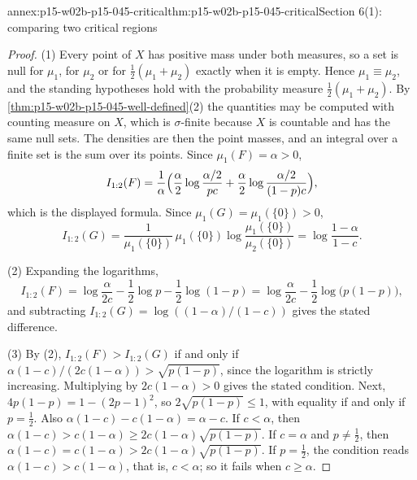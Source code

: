 \begin{annexitem}{annex:p15-w02b-p15-045-critical}{thm:p15-w02b-p15-045-critical}{Section 6(1): comparing two critical regions}
\begin{proof}
(1) Every point of \(X\) has positive mass under both measures, so a set
is null for \(\mu_1\), for \(\mu_2\) or for
\(\tfrac12(\mu_1+\mu_2)\) exactly when it is empty. Hence
\(\mu_1\equiv\mu_2\), and the standing hypotheses hold with the
probability measure \(\tfrac12(\mu_1+\mu_2)\). By
\cref{thm:p15-w02b-p15-045-well-defined}(2) the quantities may be
computed with counting measure on \(X\), which is \(\sigma\)-finite
because \(X\) is countable and has the same null sets. The densities are
then the point masses, and an integral over a finite set is the sum over
its points. Since \(\mu_1(F)=\alpha>0\),
\[
  I_{1:2}(F)=\frac1\alpha\Bigl(\frac\alpha2\log\frac{\alpha/2}{pc}
            +\frac\alpha2\log\frac{\alpha/2}{(1-p)c}\Bigr),
\]
which is the displayed formula. Since \(\mu_1(G)=\mu_1(\{0\})>0\),
\[
  I_{1:2}(G)=\frac1{\mu_1(\{0\})}\,\mu_1(\{0\})\log\frac{\mu_1(\{0\})}{\mu_2(\{0\})}
           =\log\frac{1-\alpha}{1-c}.
\]

(2) Expanding the logarithms,
\[
  I_{1:2}(F)=\log\frac\alpha{2c}-\frac12\log p-\frac12\log(1-p)
           =\log\frac\alpha{2c}-\frac12\log\bigl(p(1-p)\bigr),
\]
and subtracting \(I_{1:2}(G)=\log((1-\alpha)/(1-c))\) gives the
stated difference.

(3) By (2), \(I_{1:2}(F)>I_{1:2}(G)\) if and only if
\(\alpha(1-c)/(2c(1-\alpha))>\sqrt{p(1-p)}\), since the logarithm is
strictly increasing. Multiplying by \(2c(1-\alpha)>0\) gives the stated
condition. Next, \(4p(1-p)=1-(2p-1)^2\), so
\(2\sqrt{p(1-p)}\leq1\), with equality if and only if \(p=\tfrac12\).
Also \(\alpha(1-c)-c(1-\alpha)=\alpha-c\).
If \(c<\alpha\), then
\(\alpha(1-c)>c(1-\alpha)\geq2c(1-\alpha)\sqrt{p(1-p)}\).
If \(c=\alpha\) and \(p\neq\tfrac12\), then
\(\alpha(1-c)=c(1-\alpha)>2c(1-\alpha)\sqrt{p(1-p)}\).
If \(p=\tfrac12\), the condition reads \(\alpha(1-c)>c(1-\alpha)\), that
is, \(c<\alpha\); so it fails when \(c\geq\alpha\).
\end{proof}
\end{annexitem}
